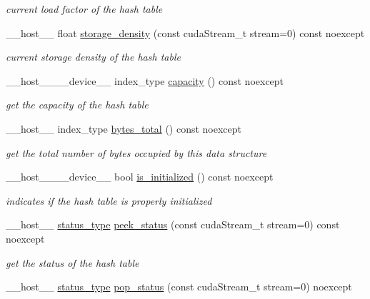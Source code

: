 \begin{DoxyCompactItemize}
\begin{DoxyCompactList}\small\item\em current load factor of the hash table \end{DoxyCompactList}\item 
\+\_\+\+\_\+host\+\_\+\+\_\+ float \hyperlink{classwarpcore_1_1SingleValueHashTable_ac593bc68b452128ae4c6ce9217c5d333}{storage\+\_\+density} (const cuda\+Stream\+\_\+t stream=0) const noexcept
\begin{DoxyCompactList}\small\item\em current storage density of the hash table \end{DoxyCompactList}\item 
\+\_\+\+\_\+host\+\_\+\+\_\+\+\_\+\+\_\+device\+\_\+\+\_\+ index\+\_\+type \hyperlink{classwarpcore_1_1SingleValueHashTable_a9804486b8ec4f3c72293e19c722e4df2}{capacity} () const noexcept
\begin{DoxyCompactList}\small\item\em get the capacity of the hash table \end{DoxyCompactList}\item 
\+\_\+\+\_\+host\+\_\+\+\_\+ index\+\_\+type \hyperlink{classwarpcore_1_1SingleValueHashTable_a1d50d30af5f5e85bbc216219ed282da5}{bytes\+\_\+total} () const noexcept
\begin{DoxyCompactList}\small\item\em get the total number of bytes occupied by this data structure \end{DoxyCompactList}\item 
\+\_\+\+\_\+host\+\_\+\+\_\+\+\_\+\+\_\+device\+\_\+\+\_\+ bool \hyperlink{classwarpcore_1_1SingleValueHashTable_ae366b3fd0d7edbac68a939fe580df9a4}{is\+\_\+initialized} () const noexcept
\begin{DoxyCompactList}\small\item\em indicates if the hash table is properly initialized \end{DoxyCompactList}\item 
\+\_\+\+\_\+host\+\_\+\+\_\+ \hyperlink{classwarpcore_1_1Status}{status\+\_\+type} \hyperlink{classwarpcore_1_1SingleValueHashTable_aeb3d8cabf825ff16453be9bfb1556085}{peek\+\_\+status} (const cuda\+Stream\+\_\+t stream=0) const noexcept
\begin{DoxyCompactList}\small\item\em get the status of the hash table \end{DoxyCompactList}\item 
\+\_\+\+\_\+host\+\_\+\+\_\+ \hyperlink{classwarpcore_1_1Status}{status\+\_\+type} \hyperlink{classwarpcore_1_1SingleValueHashTable_a46feca31bb400c78542b101456cd3cfe}{pop\+\_\+status} (const cuda\+Stream\+\_\+t stream=0) noexcept

\end{DoxyCompactItemize}

